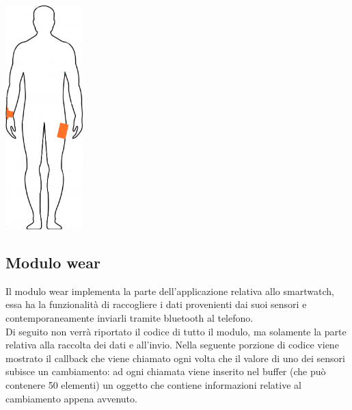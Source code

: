 \documentclass[a4paper, oneside]{book}
\begin{document}
\makebox[\linewidth]{}
\begin{minipage}{\linewidth}
\begin{center}
\includegraphics[width=30mm]{./images/sagoma_phone_watch.jpg} 
\makebox[\linewidth]{}
\label{fig:device_position}
\end{center}
\end{minipage}
\makebox[\linewidth]{}
\makebox[\linewidth]{}


\subsection{Modulo wear}
Il modulo wear implementa la parte dell’applicazione relativa allo smartwatch, essa ha la funzionalità di raccogliere i dati provenienti dai suoi sensori e contemporaneamente inviarli tramite bluetooth al telefono.\\
Di seguito non verrà riportato il codice di tutto il modulo, ma solamente la parte relativa alla raccolta dei dati e all’invio.
Nella seguente porzione di codice viene mostrato il callback che viene chiamato ogni volta che il valore di uno dei sensori subisce un cambiamento: ad ogni chiamata viene inserito nel buffer (che può contenere 50 elementi) un oggetto che contiene informazioni relative al cambiamento appena avvenuto.
\makebox[\linewidth]{}
\makebox[\linewidth]{}


\clearpage
\end{document}
